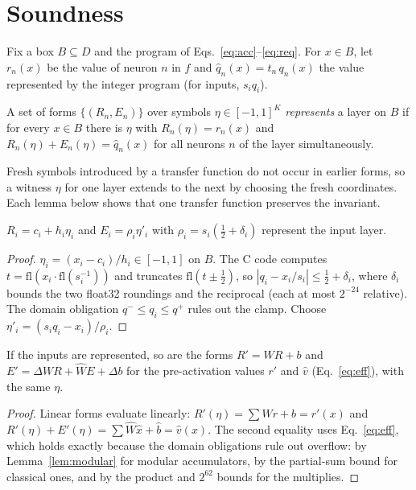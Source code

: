 \appendix
\section{Soundness}\label{app:proof}
Fix a box $B\subseteq D$ and the program of Eqs.~\eqref{eq:acc}--\eqref{eq:req}. For $x\in B$, let $r_n(x)$ be the value of neuron $n$ in $f$ and $\hat q_n(x)=t_n\,q_n(x)$ the value represented by the integer program (for inputs, $s_i q_i$).

\begin{definition}
A set of forms $\{(R_n,E_n)\}$ over symbols $\eta\in[-1,1]^K$ \emph{represents} a layer on $B$ if for every $x\in B$ there is $\eta$ with $R_n(\eta)=r_n(x)$ and $R_n(\eta)+E_n(\eta)=\hat q_n(x)$ for all neurons $n$ of the layer simultaneously.
\end{definition}
Fresh symbols introduced by a transfer function do not occur in earlier forms, so a witness $\eta$ for one layer extends to the next by choosing the fresh coordinates. Each lemma below shows that one transfer function preserves the invariant.

\begin{lemma}[Input]
$R_i=c_i+h_i\eta_i$ and $E_i=\rho_i\eta'_i$ with $\rho_i=s_i(\tfrac12+\delta_i)$ represent the input layer.
\end{lemma}
\begin{proof}
$\eta_i=(x_i-c_i)/h_i\in[-1,1]$ on $B$. The C code computes $t=\mathrm{fl}(x_i\cdot\mathrm{fl}(s_i^{-1}))$ and truncates $\mathrm{fl}(t\pm\tfrac12)$, so $|q_i-x_i/s_i|\le\tfrac12+\delta_i$, where $\delta_i$ bounds the two float32 roundings and the reciprocal (each at most $2^{-24}$ relative). The domain obligation $q^-\le q_i\le q^+$ rules out the clamp. Choose $\eta'_i=(s_iq_i-x_i)/\rho_i$.
\end{proof}

\begin{lemma}
If the inputs are represented, so are the forms $R'=WR+b$ and $E'=\Delta W R+\hat W E+\Delta b$ for the pre-activation values $r'$ and $\hat v$ (Eq.~\eqref{eq:eff}), with the same $\eta$.
\end{lemma}
\begin{proof}
Linear forms evaluate linearly: $R'(\eta)=\sum W r+b=r'(x)$ and $R'(\eta)+E'(\eta)=\sum\hat W\hat x+\hat b=\hat v(x)$. The second equality uses Eq.~\eqref{eq:eff}, which holds exactly because the domain obligations rule out overflow: by Lemma~\ref{lem:modular} for modular accumulators, by the partial-sum bound for classical ones, and by the product and $2^{62}$ bounds for the multiplies.
\end{proof}

